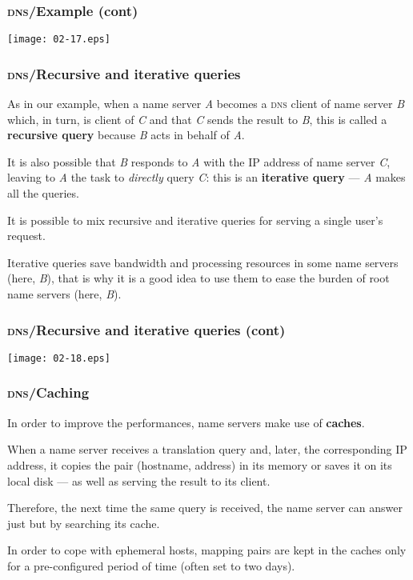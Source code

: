 %
\begin{frame}
\frametitle{\textsc{dns}/Example (cont)}

\begin{center}
\texttt{[image: 02-17.eps]}
\end{center}

\end{frame}

%
\begin{frame}
\frametitle{\textsc{dns}/Recursive
  and iterative queries}

As in our example, when a name server \emph{A} becomes a \textsc{dns}
client of name server \emph{B} which, in turn, is client of \emph{C}
and that \emph{C} sends the result to \emph{B}, this is called a
\textbf{recursive query} because \emph{B} acts in behalf of \emph{A}.

It is also possible that \emph{B} responds to \emph{A} with the IP
address of name server \emph{C}, leaving to \emph{A} the task to
\emph{directly} query \emph{C}: this is an \textbf{iterative query}
--- \emph{A} makes all the queries.

It is possible to mix recursive and iterative queries for serving a
single user's request.

Iterative queries save bandwidth and processing resources in some name
servers (here, \emph{B}), that is why it is a good idea to use them to
ease the burden of root name servers (here, \emph{B}).

\end{frame}

%
\begin{frame}
\frametitle{\textsc{dns}/Recursive
  and iterative queries (cont)}

\begin{center}
\texttt{[image: 02-18.eps]}
\end{center}

\end{frame}

%
\begin{frame}
\frametitle{\textsc{dns}/Caching}

In order to improve the performances, name servers make use of
\textbf{caches}.

When a name server receives a translation query and, later, the
corresponding IP address, it copies the pair (hostname, address) in
its memory or saves it on its local disk --- as well as serving the
result to its client.

Therefore, the next time the same query is received, the name server
can answer just but by searching its cache.

In order to cope with ephemeral hosts, mapping pairs are kept in the
caches only for a pre-configured period of time (often set to two
days).

\end{frame}

